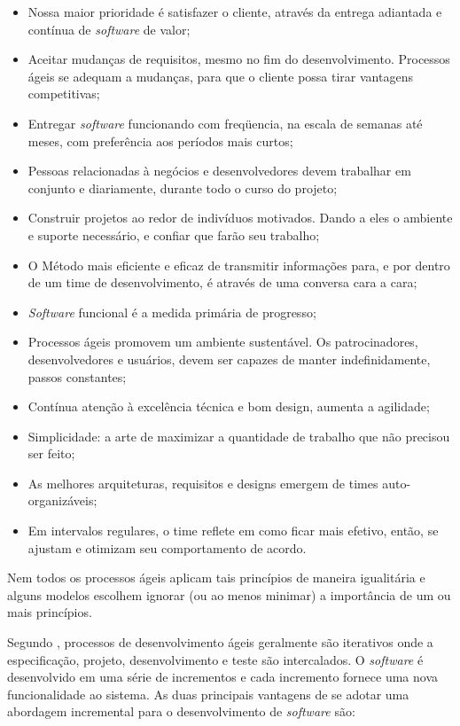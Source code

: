 \begin{itemize}
    \item Nossa maior prioridade é satisfazer o cliente, através da entrega adiantada e contínua de \textit{software} de valor;
    \item Aceitar mudanças de requisitos, mesmo no fim do desenvolvimento. Processos ágeis se adequam a mudanças, para que o cliente possa tirar vantagens competitivas;
    \item Entregar \textit{software} funcionando com freqüencia, na escala de semanas até meses, com preferência aos períodos mais curtos;
    \item Pessoas relacionadas à negócios e desenvolvedores devem trabalhar em conjunto e diariamente, durante todo o curso do projeto;
    \item Construir projetos ao redor de indivíduos motivados. Dando a eles o ambiente e suporte necessário, e confiar que farão seu trabalho;
    \item O Método mais eficiente e eficaz de transmitir informações para, e por dentro de um time de desenvolvimento, é através de uma conversa cara a cara;
    \item \textit{Software} funcional é a medida primária de progresso;
    \item Processos ágeis promovem um ambiente sustentável. Os patrocinadores, desenvolvedores e usuários, devem ser capazes de manter indefinidamente, passos constantes;
    \item Contínua atenção à excelência técnica e bom design, aumenta a agilidade;
    \item Simplicidade: a arte de maximizar a quantidade de trabalho que não precisou ser feito;
    \item As melhores arquiteturas, requisitos e designs emergem de times auto-organizáveis;
    \item Em intervalos regulares, o time reflete em como ficar mais efetivo, então, se ajustam e otimizam seu comportamento de acordo.
\end{itemize}

Nem todos os processos ágeis aplicam tais princípios de maneira igualitária e alguns modelos escolhem ignorar (ou ao menos minimar) a importância de um ou mais princípios. \cite{pressman_2009}

Segundo \cite{sommerville_2006}, processos de desenvolvimento ágeis geralmente são iterativos onde a
especificação, projeto, desenvolvimento e teste são intercalados. O \textit{software} é desenvolvido
em uma série de incrementos e cada incremento fornece uma nova funcionalidade ao sistema. As duas principais
vantagens de se adotar uma abordagem incremental para o desenvolvimento de \textit{software} são:

